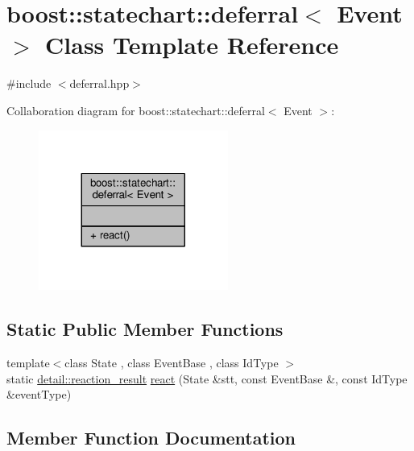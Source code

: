 \hypertarget{classboost_1_1statechart_1_1deferral}{}\section{boost\+:\+:statechart\+:\+:deferral$<$ Event $>$ Class Template Reference}
\label{classboost_1_1statechart_1_1deferral}


{\ttfamily \#include $<$deferral.\+hpp$>$}



Collaboration diagram for boost\+:\+:statechart\+:\+:deferral$<$ Event $>$\+:
\nopagebreak
\begin{figure}[H]
\begin{center}
\leavevmode
\includegraphics[width=176pt]{classboost_1_1statechart_1_1deferral__coll__graph}
\end{center}
\end{figure}
\subsection*{Static Public Member Functions}
\begin{DoxyCompactItemize}
\item 
{\footnotesize template$<$class State , class Event\+Base , class Id\+Type $>$ }\\static \mbox{\hyperlink{namespaceboost_1_1statechart_1_1detail_ab091bbb4c29327fb46ee479ea1b7255b}{detail\+::reaction\+\_\+result}} \mbox{\hyperlink{classboost_1_1statechart_1_1deferral_ab484b1838dac52a4f49a6ce61ef5f0cc}{react}} (State \&stt, const Event\+Base \&, const Id\+Type \&event\+Type)
\end{DoxyCompactItemize}


\subsection{Member Function Documentation}
\mbox{\label{classboost_1_1statechart_1_1deferral_ab484b1838dac52a4f49a6ce61ef5f0cc}} 
